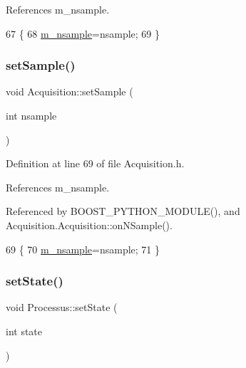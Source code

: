 References m\+\_\+nsample.


\begin{DoxyCode}
67                              \{
68     \hyperlink{classAcquisition_a26d0f1a44309ffac49c365b7ee568ab2}{m\_nsample}=nsample;
69   \}
\end{DoxyCode}
\mbox{\label{classAcquisition_ade6fd6483b3e3737fe7dcdffb5065954}} 
\subsubsection{\texorpdfstring{set\+Sample()}{setSample()}\hspace{0.1cm}{\footnotesize\ttfamily [2/2]}}
{\footnotesize\ttfamily void Acquisition\+::set\+Sample (\begin{DoxyParamCaption}\item[{int}]{nsample }\end{DoxyParamCaption})\hspace{0.3cm}{\ttfamily [inline]}}



Definition at line 69 of file Acquisition.\+h.



References m\+\_\+nsample.



Referenced by B\+O\+O\+S\+T\+\_\+\+P\+Y\+T\+H\+O\+N\+\_\+\+M\+O\+D\+U\+L\+E(), and Acquisition.\+Acquisition\+::on\+N\+Sample().


\begin{DoxyCode}
69                              \{
70     \hyperlink{classAcquisition_a26d0f1a44309ffac49c365b7ee568ab2}{m\_nsample}=nsample;
71   \}
\end{DoxyCode}
\mbox{\label{classProcessus_ad38cde0f1bcefa00b068e7947b8af927}} 
\subsubsection{\texorpdfstring{set\+State()}{setState()}}
{\footnotesize\ttfamily void Processus\+::set\+State (\begin{DoxyParamCaption}\item[{int}]{state }\end{DoxyParamCaption})\hspace{0.3cm}{\ttfamily [inherited]}}

